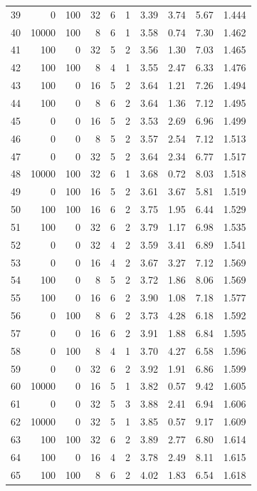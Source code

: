 \begin{footnotesize}
\begin{longtable}{@{}rrrrrrrrrr@{}}
39 & 0 & 100 & 32 & 6 & 1 & 3.39 & 3.74 & 5.67 & 1.444 \\
40 & 10000 & 100 & 8 & 6 & 1 & 3.58 & 0.74 & 7.30 & 1.462 \\
41 & 100 & 0 & 32 & 5 & 2 & 3.56 & 1.30 & 7.03 & 1.465 \\
42 & 100 & 100 & 8 & 4 & 1 & 3.55 & 2.47 & 6.33 & 1.476 \\
43 & 100 & 0 & 16 & 5 & 2 & 3.64 & 1.21 & 7.26 & 1.494 \\
44 & 100 & 0 & 8 & 6 & 2 & 3.64 & 1.36 & 7.12 & 1.495 \\
45 & 0 & 0 & 16 & 5 & 2 & 3.53 & 2.69 & 6.96 & 1.499 \\
46 & 0 & 0 & 8 & 5 & 2 & 3.57 & 2.54 & 7.12 & 1.513 \\
47 & 0 & 0 & 32 & 5 & 2 & 3.64 & 2.34 & 6.77 & 1.517 \\
48 & 10000 & 100 & 32 & 6 & 1 & 3.68 & 0.72 & 8.03 & 1.518 \\
49 & 0 & 100 & 16 & 5 & 2 & 3.61 & 3.67 & 5.81 & 1.519 \\
50 & 100 & 100 & 16 & 6 & 2 & 3.75 & 1.95 & 6.44 & 1.529 \\
51 & 100 & 0 & 32 & 6 & 2 & 3.79 & 1.17 & 6.98 & 1.535 \\
52 & 0 & 0 & 32 & 4 & 2 & 3.59 & 3.41 & 6.89 & 1.541 \\
53 & 0 & 0 & 16 & 4 & 2 & 3.67 & 3.27 & 7.12 & 1.569 \\
54 & 100 & 0 & 8 & 5 & 2 & 3.72 & 1.86 & 8.06 & 1.569 \\
55 & 100 & 0 & 16 & 6 & 2 & 3.90 & 1.08 & 7.18 & 1.577 \\
56 & 0 & 100 & 8 & 6 & 2 & 3.73 & 4.28 & 6.18 & 1.592 \\
57 & 0 & 0 & 16 & 6 & 2 & 3.91 & 1.88 & 6.84 & 1.595 \\
58 & 0 & 100 & 8 & 4 & 1 & 3.70 & 4.27 & 6.58 & 1.596 \\
59 & 0 & 0 & 32 & 6 & 2 & 3.92 & 1.91 & 6.86 & 1.599 \\
60 & 10000 & 0 & 16 & 5 & 1 & 3.82 & 0.57 & 9.42 & 1.605 \\
61 & 0 & 0 & 32 & 5 & 3 & 3.88 & 2.41 & 6.94 & 1.606 \\
62 & 10000 & 0 & 32 & 5 & 1 & 3.85 & 0.57 & 9.17 & 1.609 \\
63 & 100 & 100 & 32 & 6 & 2 & 3.89 & 2.77 & 6.80 & 1.614 \\
64 & 100 & 0 & 16 & 4 & 2 & 3.78 & 2.49 & 8.11 & 1.615 \\
65 & 100 & 100 & 8 & 6 & 2 & 4.02 & 1.83 & 6.54 & 1.618 \\

\end{longtable}
\end{footnotesize}
